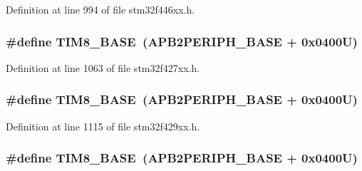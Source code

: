 Definition at line 994 of file stm32f446xx.\+h.

\subsubsection[{\texorpdfstring{T\+I\+M8\+\_\+\+B\+A\+SE}{TIM8_BASE}}]{\setlength{\rightskip}{0pt plus 5cm}\#define T\+I\+M8\+\_\+\+B\+A\+SE~({\bf A\+P\+B2\+P\+E\+R\+I\+P\+H\+\_\+\+B\+A\+SE} + 0x0400\+U)}\hypertarget{group___peripheral__memory__map_ga5b72f698b7a048a6f9fcfe2efe5bc1db}{}\label{group___peripheral__memory__map_ga5b72f698b7a048a6f9fcfe2efe5bc1db}


Definition at line 1063 of file stm32f427xx.\+h.

\subsubsection[{\texorpdfstring{T\+I\+M8\+\_\+\+B\+A\+SE}{TIM8_BASE}}]{\setlength{\rightskip}{0pt plus 5cm}\#define T\+I\+M8\+\_\+\+B\+A\+SE~({\bf A\+P\+B2\+P\+E\+R\+I\+P\+H\+\_\+\+B\+A\+SE} + 0x0400\+U)}\hypertarget{group___peripheral__memory__map_ga5b72f698b7a048a6f9fcfe2efe5bc1db}{}\label{group___peripheral__memory__map_ga5b72f698b7a048a6f9fcfe2efe5bc1db}


Definition at line 1115 of file stm32f429xx.\+h.

\subsubsection[{\texorpdfstring{T\+I\+M8\+\_\+\+B\+A\+SE}{TIM8_BASE}}]{\setlength{\rightskip}{0pt plus 5cm}\#define T\+I\+M8\+\_\+\+B\+A\+SE~({\bf A\+P\+B2\+P\+E\+R\+I\+P\+H\+\_\+\+B\+A\+SE} + 0x0400\+U)}\hypertarget{group___peripheral__memory__map_ga5b72f698b7a048a6f9fcfe2efe5bc1db}{}\label{group___peripheral__memory__map_ga5b72f698b7a048a6f9fcfe2efe5bc1db}


